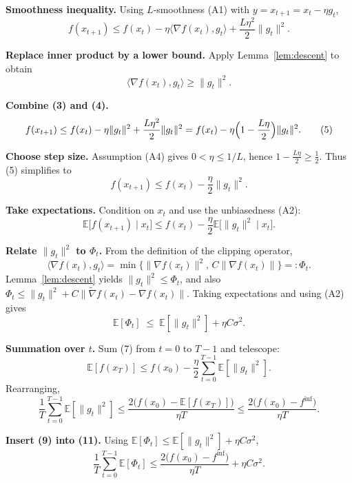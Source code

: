 \documentclass{article}
\newcommand{\E}{\mathbb{E}}
\begin{document}
\begin{enumerate}[label={\bf[Step \arabic*]}]
\item \textbf{Smoothness inequality.}  
Using $L$‑smoothness (A1) with $y=x_{t+1}=x_{t}-\eta g_{t}$,
\[
f(x_{t+1})\le f(x_{t})-\eta\langle\nabla f(x_{t}),g_{t}\rangle
+\frac{L\eta^{2}}{2}\|g_{t}\|^{2}.
\tag{3}
\]

\item \textbf{Replace inner product by a lower bound.}  
Apply Lemma~\ref{lem:descent} to obtain
\[
\langle\nabla f(x_{t}),g_{t}\rangle\ge\|g_{t}\|^{2}.
\tag{4}
\]

\item \textbf{Combine (3) and (4).}  
\[
f(x_{t+1})\le f(x_{t})-\eta\|g_{t}\|^{2}
+\frac{L\eta^{2}}{2}\|g_{t}\|^{2}
= f(x_{t})-\eta\Bigl(1-\frac{L\eta}{2}\Bigr)\|g_{t}\|^{2}.
\tag{5}
\]

\item \textbf{Choose step size.}  
Assumption (A4) gives $0<\eta\le1/L$, hence $1-\tfrac{L\eta}{2}\ge\tfrac12$.
Thus (5) simplifies to
\[
f(x_{t+1})\le f(x_{t})-\frac{\eta}{2}\|g_{t}\|^{2}.
\tag{6}
\]

\item \textbf{Take expectations.}  
Condition on $x_{t}$ and use the unbiasedness (A2):
\[
\E\bigl[f(x_{t+1})\mid x_{t}\bigr]
\le f(x_{t})-\frac{\eta}{2}\E\bigl[\|g_{t}\|^{2}\mid x_{t}\bigr].
\tag{7}
\]

\item \textbf{Relate $\|g_{t}\|^{2}$ to $\Phi_{t}$.}  
From the definition of the clipping operator,
\[
\langle\nabla f(x_{t}),g_{t}\rangle
= \min\!\bigl\{\|\nabla f(x_{t})\|^{2},\,C\|\nabla f(x_{t})\|\bigr\}
=: \Phi_{t}.
\tag{8}
\]
Lemma~\ref{lem:descent} yields $\|g_{t}\|^{2}\le\Phi_{t}$, and also
$\Phi_{t}\le\|g_{t}\|^{2}+C\|\widetilde{\nabla}f(x_{t})-\nabla f(x_{t})\|$.
Taking expectations and using (A2) gives
\[
\E[\Phi_{t}]\;\le\;\E[\|g_{t}\|^{2}]+\eta C\sigma^{2}.
\tag{9}
\]

\item \textbf{Summation over $t$.}  
Sum (7) from $t=0$ to $T-1$ and telescope:
\[
\E[f(x_{T})]\le f(x_{0})-\frac{\eta}{2}\sum_{t=0}^{T-1}\E[\|g_{t}\|^{2}].
\tag{10}
\]
Rearranging,
\[
\frac{1}{T}\sum_{t=0}^{T-1}\E[\|g_{t}\|^{2}]
\le\frac{2\bigl(f(x_{0})- \E[f(x_{T})]\bigr)}{\eta T}
\le\frac{2\bigl(f(x_{0})-f^{\inf}\bigr)}{\eta T}.
\tag{11}
\]

\item \textbf{Insert (9) into (11).}  
Using $\E[\Phi_{t}]\le\E[\|g_{t}\|^{2}]+ \eta C\sigma^{2}$,
\[
\frac{1}{T}\sum_{t=0}^{T-1}\E[\Phi_{t}]
\le\frac{2\bigl(f(x_{0})-f^{\inf}\bigr)}{\eta T}+ \eta C\sigma^{2}.
\tag{12}
\]


\end{enumerate}
\end{document}
